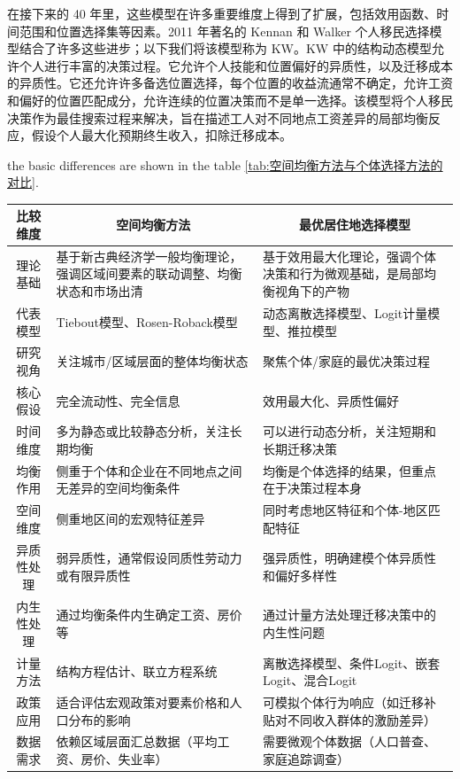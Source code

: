 \documentclass[a4paper,12pt,oneside]{book} %
\begin{document}
在接下来的 40 年里，这些模型在许多重要维度上得到了扩展，包括效用函数、时间范围和位置选择集等因素。2011 年著名的 Kennan 和 Walker 个人移民选择模型结合了许多这些进步；以下我们将该模型称为 KW。KW 中的结构动态模型允许个人进行丰富的决策过程。它允许个人技能和位置偏好的异质性，以及迁移成本的异质性。它还允许许多备选位置选择，每个位置的收益流通常不确定，允许工资和偏好的位置匹配成分，允许连续的位置决策而不是单一选择。该模型将个人移民决策作为最佳搜索过程来解决，旨在描述工人对不同地点工资差异的局部均衡反应，假设个人最大化预期终生收入，扣除迁移成本。

the basic differences are shown in the table \ref{tab:空间均衡方法与个体选择方法的对比}.

\begin{table}[!ht]
\centering
\begin{tabularx}{\textwidth}{@{}cXX@{}} 
\toprule
\textbf{比较维度} & \multicolumn{1}{c}{\textbf{空间均衡方法}} & \multicolumn{1}{c}{\textbf{最优居住地选择模型}} \\ \midrule
理论基础 & 基于新古典经济学一般均衡理论，强调区域间要素的联动调整、均衡状态和市场出清 & 基于效用最大化理论，强调个体决策和行为微观基础，是局部均衡视角下的产物 \\
代表模型 & Tiebout模型、Rosen-Roback模型 & 动态离散选择模型、Logit计量模型、推拉模型 \\
研究视角 & 关注城市/区域层面的整体均衡状态 & 聚焦个体/家庭的最优决策过程 \\
核心假设 & 完全流动性、完全信息 & 效用最大化、异质性偏好 \\
时间维度 & 多为静态或比较静态分析，关注长期均衡 & 可以进行动态分析，关注短期和长期迁移决策 \\
均衡作用 & 侧重于个体和企业在不同地点之间无差异的空间均衡条件 & 均衡是个体选择的结果，但重点在于决策过程本身 \\
空间维度 & 侧重地区间的宏观特征差异 & 同时考虑地区特征和个体-地区匹配特征 \\
异质性处理 & 弱异质性，通常假设同质性劳动力或有限异质性 & 强异质性，明确建模个体异质性和偏好多样性 \\
内生性处理 & 通过均衡条件内生确定工资、房价等 & 通过计量方法处理迁移决策中的内生性问题 \\
计量方法 & 结构方程估计、联立方程系统 & 离散选择模型、条件Logit、嵌套Logit、混合Logit \\
政策应用 & 适合评估宏观政策对要素价格和人口分布的影响 & 可模拟个体行为响应（如迁移补贴对不同收入群体的激励差异） \\
数据需求 & 依赖区域层面汇总数据（平均工资、房价、失业率） & 需要微观个体数据（人口普查、家庭追踪调查） \\

\end{tabularx}
\end{table}
\end{document}
